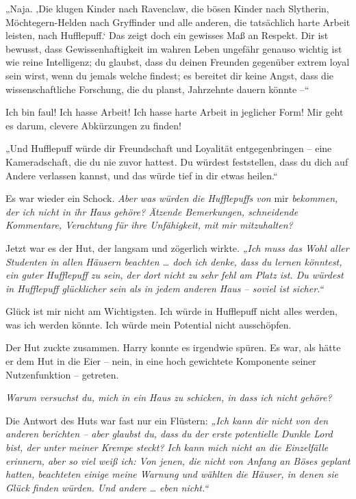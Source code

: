 {„Naja. ‚Die klugen Kinder nach Ravenclaw, die bösen Kinder nach Slytherin, Möchtegern-Helden nach Gryffinder und alle anderen, die tatsächlich harte Arbeit leisten, nach Hufflepuff.` Das zeigt doch ein gewisses Maß an Respekt. Dir ist bewusst, dass Gewissenhaftigkeit im wahren Leben ungefähr genauso wichtig ist wie reine Intelligenz; du glaubst, dass du deinen Freunden gegenüber extrem loyal sein wirst, wenn du jemals welche findest; es bereitet dir keine Angst, dass die wissenschaftliche Forschung, die du planst, Jahrzehnte dauern könnte --“

Ich bin faul! Ich hasse Arbeit! Ich hasse harte Arbeit in jeglicher Form! Mir geht es darum, clevere Abkürzungen zu finden!

„Und Hufflepuff würde dir Freundschaft und Loyalität entgegenbringen -- eine Kameradschaft, die du nie zuvor hattest. Du würdest feststellen, dass du dich auf Andere verlassen kannst, und das würde tief in dir etwas heilen.“

Es war wieder ein Schock. \emph{Aber was würden die Hufflepuffs von} mir \emph{bekommen, der ich nicht in ihr Haus gehöre? Ätzende Bemerkungen, schneidende Kommentare, Verachtung für ihre Unfähigkeit, mit mir mitzuhalten?}

Jetzt war es der Hut, der langsam und zögerlich wirkte. \emph{„Ich muss das Wohl aller Studenten in allen Häusern beachten … doch ich denke, dass du lernen könntest, ein guter Hufflepuff zu sein, der dort nicht zu sehr fehl am Platz ist. Du würdest in Hufflepuff glücklicher sein als in jedem anderen Haus -- soviel ist sicher.“}

Glück ist mir nicht am Wichtigsten. Ich würde in Hufflepuff nicht alles werden, was ich werden könnte. Ich würde mein Potential nicht ausschöpfen.

Der Hut zuckte zusammen. Harry konnte es irgendwie spüren. Es war, als hätte er dem Hut in die Eier -- nein, in eine hoch gewichtete Komponente seiner Nutzenfunktion -- getreten.

\emph{Warum versuchst du, mich in ein Haus zu schicken, in dass ich nicht gehöre?}

Die Antwort des Huts war fast nur ein Flüstern: \emph{„Ich kann dir nicht von den anderen berichten -- aber glaubst du, dass du der erste potentielle Dunkle Lord bist, der unter meiner Krempe steckt? Ich kann mich nicht an die Einzelfälle erinnern, aber so viel weiß ich: Von jenen, die nicht von Anfang an Böses geplant hatten, beachteten einige meine Warnung und wählten die Häuser, in denen sie Glück finden würden. Und andere … eben nicht.“}

}

